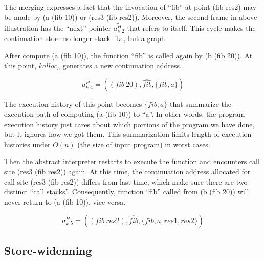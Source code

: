 \documentclass{article}
\begin{document}
The merging expresses a fact that the invocation of ``fib'' at point (fib res2) may be made by (a (fib 10)) or (res3 (fib res2)). Moreover, the second frame in above illustration has the ``next'' pointer $\widetilde{a^H_k{}_2}$ that refers to itself. This cycle makes the continuation store no longer stack-like, but a graph.

After compute (a (fib 10)), the function ``fib'' is called again by (b (fib 20)). At this point, $\widetilde{kalloc_h}$ generates a new continuation address.

\[
\widetilde{a^H_k{}_4} = ((fib\ 20), \widehat{fib}, \{fib, a\})
\]

The execution history of this point becomes $\{fib, a\}$ that summarize the execution path of computing (a (fib 10)) to ``a''. In other words, the program execution history just cares about which portions of the program we have done, but it ignores how we got them. This summarization limits length of execution histories under $O(\textit{n})$ (the size of input program) in worst cases.

Then the abstract interpreter restarts to execute the function and encounters call site (res3 (fib res2)) again. At this time, the continuation address allocated for call site (res3 (fib res2)) differs from last time, which make sure there are two distinct ``call stacks''. Consequently, function ``fib'' called from (b (fib 20)) will never return to (a (fib 10)), vice versa.

\[
\widetilde{a^H_k{}_5} = ((fib\ res2), \widehat{fib}, \{fib, a, res1, res2\})
\]

\subsection{Store-widenning}
\label{sub:Store-widenning}
\end{document}

